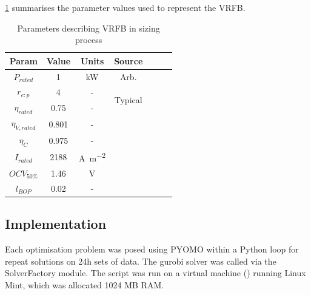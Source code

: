 \documentclass[preprint,3p,review,authoryear,10pt]{elsarticle}
\begin{document}
\cref{tab:VRFB_Sizing_Params} summarises the parameter values used to represent the VRFB.

\begin{table}[!pht]
\captionsetup{font=normalsize}
\centering
\caption{Parameters describing VRFB in sizing process}
\label{tab:VRFB_Sizing_Params}
\begin{tabular}{ccccccc}
\hline
Param &  Value & Units &  Source \\
\hline
$P_{rated}$ & 1 & \si{\kilo\watt} & Arb.\\
$r_{e:p}$ & 4 & - & \multirow{2}{*}{Typical}\\
$\eta_{rated}$ & 0.75 & - \\
\hline
$\eta_{V,rated}$ & 0.801 & - &\multirow{3}{*}{\cite{Reed2016}}\\
$\eta_C$ & 0.975 & -\\
$I_{rated}$ & 2188 & \si{\ampere\per\square\meter} \\
\hline
$OCV_{50\%}$ & 1.46 & \si{\volt} & \cite{Kim2011}\\
$l_{BOP}$ & 0.02 & - & \cite{Kim2013}\\

\hline
\end{tabular}
\end{table}

\subsection{Implementation}
\label{Results_Implementation}
Each optimisation problem was posed using PYOMO within a Python loop for repeat solutions on 24h sets of data. The gurobi solver was called via the SolverFactory module. The script was run on a virtual machine (\cite{VirtualBox}) running Linux Mint, which was allocated 1024 MB RAM.
\end{document}
